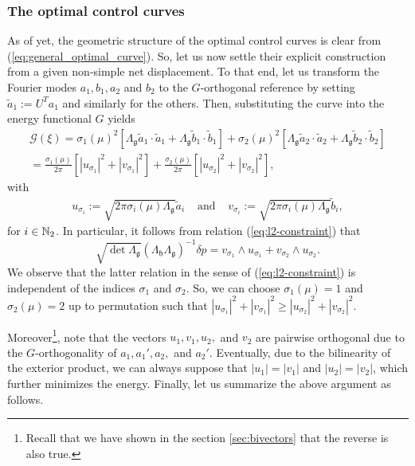 \subsubsection{The optimal control curves}
As of yet, the geometric structure of the optimal control curves is clear from (\ref{eq:general_optimal_curve}). So, let us now settle their explicit construction from a given non-simple net displacement. To that end, let us transform the Fourier modes $a_1, b_1, a_2$ and $b_2$ to the $G$-orthogonal reference by setting $\tilde{a}_1 := U^Ta_1$ and similarly for the others. Then, substituting the curve into the energy functional $G$ yields
\begin{align}
\label{eq:optimal_energy}
	\mathcal{G}(\xi) = \sigma_1(\mu)^2[\Lambda_{\mathfrak{g}}\tilde{a}_1 \cdot \tilde{a}_1 + \Lambda_\mathfrak{g} \tilde{b}_1 \cdot \tilde{b}_1] + \sigma_2(\mu)^2[\Lambda_{\mathfrak{g}} \tilde{a}_2 \cdot \tilde{a}_2 + \Lambda_{\mathfrak{g}}\tilde{b}_2 \cdot \tilde{b}_2]\\
	=\frac{\sigma_1(\mu)}{2 \pi} [|u_{\sigma_1}|^2 + |v_{\sigma_1}|^2] + \frac{\sigma_2(\mu)}{2 \pi}[|u_{\sigma_2}|^2 + |v_{\sigma_2}|^2],
\end{align}
with 
\begin{align}
	u_{\sigma_i} := \sqrt{2 \pi \sigma_i(\mu) \Lambda_\mathfrak{g}}\tilde{a}_i &\text{ and }& v_{\sigma_i} := \sqrt{2 \pi \sigma_i(\mu) \Lambda_{\mathfrak{g}}} \tilde{b}_i,
\end{align}
for $i \in \mathbb{N}_2$. In particular, it follows from relation (\ref{eq:l2-constraint}) that
\begin{equation}
	\sqrt{\det \Lambda_{\mathfrak{g}}}(\Lambda_{\mathfrak{h}} \Lambda_{\mathfrak{g}})^{-1} \delta p = v_{\sigma_1} \wedge u_{\sigma_1} + v_{\sigma_2} \wedge u_{\sigma_2}.
\end{equation}
We observe that the latter relation in the sense of (\ref{eq:l2-constraint}) is independent of the indices $\sigma_1$ and $\sigma_2$.  So, we can choose $\sigma_1(\mu) = 1$ and $ \sigma_2(\mu) = 2$ up to permutation such that $|u_{\sigma_1}|^2 + |v_{\sigma_1}|^2 \geq |u_{\sigma_2}|^2 + |v_{\sigma_2}|^2$.

Moreover\footnote{Recall that we have shown in the section \ref{sec:bivectors} that the reverse is also true.}, note that the vectors $u_1, v_1, u_2,$ and $v_2$ are pairwise orthogonal due to the $G$-orthogonality of $a_1, a_1', a_2,$ and $a_2'$. Eventually, due to the bilinearity of the exterior product, we can always suppose that $|u_1| = |v_1|$ and $|u_2| = |v_2|$, which further minimizes the energy. Finally, let us summarize the above argument as follows.

